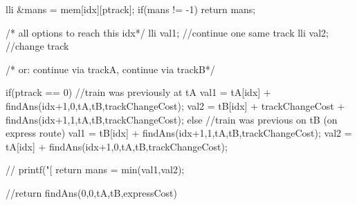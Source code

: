 \begin{solution}
\begin{fullwidth}
\begin{code3}
{        lli &mans = mem[idx][ptrack];
        if(mans != -1) return mans;
        
        /* all options to reach this idx*/
        lli val1; //continue one same track
        lli val2; //change track
        
        /* or: continue via trackA, continue via trackB*/
        
        if(ptrack == 0) //train was previously at tA
        {
            val1 =  tA[idx] + findAns(idx+1,0,tA,tB,trackChangeCost); 
            val2 =  tB[idx] + trackChangeCost
                            + findAns(idx+1,1,tA,tB,trackChangeCost); 
        }
        else //train was previous on tB (on express route)
        {
            val1 =  tB[idx] + findAns(idx+1,1,tA,tB,trackChangeCost); 
            val2 =  tA[idx] + findAns(idx+1,0,tA,tB,trackChangeCost);
        }
        
        // printf("[%
        return  mans = min(val1,val2);
    }

       //return findAns(0,0,tA,tB,expressCost) 
    \end{code3}
\end{fullwidth}

\end{solution}